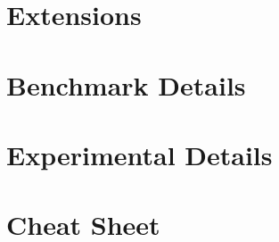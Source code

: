\section{\backpacktitle Extensions}\label{backpack::app:backpack-extensions}


\section{Benchmark Details}\label{backpack::app:benchmark}


\section{Experimental Details}\label{backpack::app:experiments}


\section{\backpacktitle Cheat Sheet}\label{backpack::app:cheat-sheet}


